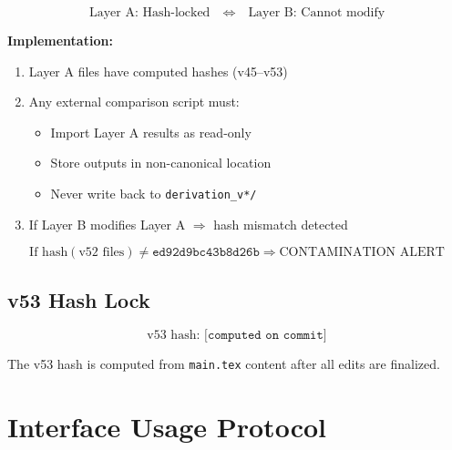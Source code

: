 \documentclass[11pt,a4paper]{article}
\theoremstyle{definition}
\begin{document}
\begin{firewallbox}
\begin{equation}
\label{eq:firewall_def}
\boxed{\text{Layer A: Hash-locked} \quad \Longleftrightarrow \quad \text{Layer B: Cannot modify}}
\end{equation}

\textbf{Implementation:}
\begin{enumerate}
\item Layer A files have computed hashes (v45--v53)
\item Any external comparison script must:
\begin{itemize}
\item Import Layer A results as read-only
\item Store outputs in non-canonical location
\item Never write back to \texttt{derivation\_v*/}
\end{itemize}
\item If Layer B modifies Layer A $\Rightarrow$ hash mismatch detected
\end{enumerate}
\end{firewallbox}

\begin{equation}
\label{eq:firewall_check}
\text{If } \text{hash}(\text{v52 files}) \neq \texttt{ed92d9bc43b8d26b} \Rightarrow \text{CONTAMINATION ALERT}
\end{equation}

\subsection{v53 Hash Lock}
\label{subsec:v53_hash}

\begin{equation}
\label{eq:v53_hash}
\text{v53 hash: } \texttt{[computed on commit]}
\end{equation}

The v53 hash is computed from \texttt{main.tex} content after all edits are finalized.

\section{Interface Usage Protocol}
\label{sec:usage}
\end{document}
